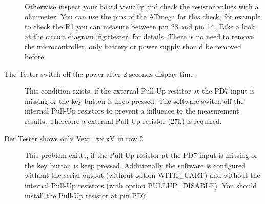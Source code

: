 \begin{description}
Otherwise inspect your board visually and check the resistor values
with a ohmmeter. You can use the pins of the ATmega for this check, for example
to check the R1 you can measure between pin 23 and pin 14. Take a look at the
circuit diagram \ref{fig:ttester} for details. There is no need to
remove the microcontroller, only battery or power supply should be removed before.

\item[The Tester switch off the power after 2 seconds display time] 
This condition exists, if the external Pull-Up resistor at the PD7 input
is missing or the key button is keep pressed.
The software switch off the internal Pull-Up resistors to prevent a influence
to the measurement results. Therefore a external Pull-Up resistor (27k) is required.

\item[Der Tester shows only Vext=xx.xV in row 2]
This problem exists, if the Pull-Up resistor at the PD7 input
is missing or the key button is keep pressed.
Additionally the software is configured without the serial output (without option WITH\_UART) and
without the internal Pull-Up resistors (with option PULLUP\_DISABLE).
You should install the Pull-Up resistor at pin PD7.


\end{description}
